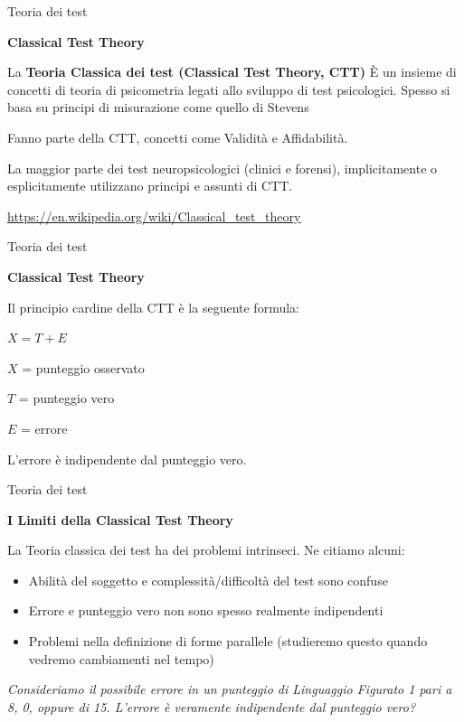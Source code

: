\documentclass[
  ignorenonframetext,
]{beamer}
\begin{document}
\begin{frame}{Teoria dei test}
\label{teoria-dei-test}
\begin{center}
  \textbf{Classical Test Theory}
\end{center}

La \textbf{Teoria Classica dei test (Classical Test Theory, CTT)} È un
insieme di concetti di teoria di psicometria legati allo sviluppo di
test psicologici. Spesso si basa su principi di misurazione come quello
di Stevens \pause

Fanno parte della CTT, concetti come Validità e Affidabilità. \pause

La maggior parte dei test neuropsicologici (clinici e forensi),
implicitamente o esplicitamente utilizzano principi e assunti di CTT.
\pause

\href{https://en.wikipedia.org/wiki/Classical_test_theory}{\ul{https://en.wikipedia.org/wiki/Classical\_test\_theory}}
\end{frame}

\begin{frame}{Teoria dei test}
\label{teoria-dei-test-1}
\begin{center}
  \textbf{Classical Test Theory}
\end{center}

Il principio cardine della CTT è la seguente formula:

\begin{center}
$X = T + E$
\end{center}
\pause

\(X\) = punteggio osservato

\(T\) = punteggio vero

\(E\) = errore \pause \vspace{1.5em}

L'errore è indipendente dal punteggio vero.
\end{frame}

\begin{frame}{Teoria dei test}
\label{teoria-dei-test-2}
\begin{center}
  \textbf{I Limiti della Classical Test Theory}
\end{center}

La Teoria classica dei test ha dei problemi intrinseci. Ne citiamo
alcuni: \pause

\begin{itemize}[<+->]
\item
  Abilità del soggetto e complessità/difficoltà del test sono confuse
\item
  Errore e punteggio vero non sono spesso realmente indipendenti
\item
  Problemi nella definizione di forme parallele (studieremo questo
  quando vedremo cambiamenti nel tempo)
\end{itemize}

\emph{Consideriamo il possibile errore in un punteggio di Linguaggio
Figurato 1 pari a 8, 0, oppure di 15. L'errore è veramente indipendente
dal punteggio vero?}
\end{frame}
\end{document}
